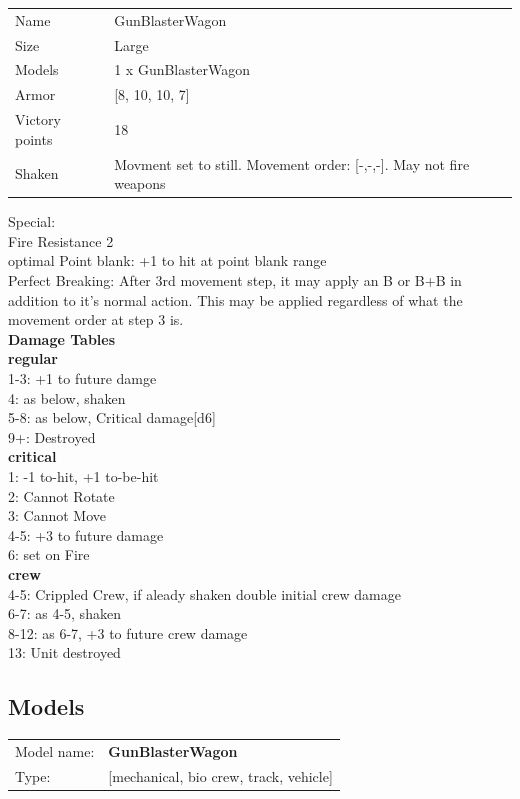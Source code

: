 \begin{tabular}{ll}
  Name & GunBlasterWagon \\
  Size & Large\\
  Models & 1 x GunBlasterWagon\\
  Armor & [8, 10, 10, 7]\\
  Victory points & 18\\
  Shaken & Movment set to still. Movement order: [-,-,-]. May not fire weapons\\
\end{tabular}

Special: \\
Fire Resistance 2\\ 
optimal Point blank: +1 to hit at point blank range\\ 
Perfect Breaking: After 3rd movement step, it may apply an B or B+B in addition to it's normal action. This may be applied regardless of what the movement order at step 3 is.\\ 



{\bf Damage Tables} \\
 {\bf regular } \\
1-3: +1 to future damge \\
4: as below, shaken \\
5-8: as below, Critical damage[d6] \\
9+: Destroyed \\
 {\bf critical } \\
1: -1 to-hit, +1 to-be-hit \\
2: Cannot Rotate \\
3: Cannot Move \\
4-5: +3 to future damage \\
6: set on Fire \\
{\bf crew } \\
4-5: Crippled Crew, if aleady shaken double initial crew damage \\
6-7: as 4-5, shaken \\
8-12: as 6-7, +3 to future crew damage \\
13: Unit destroyed \\


\clearpage

\subsection{ Models }

\begin{tabular}{ll}
Model name: & {\bf GunBlasterWagon } \\
Type: & [mechanical, bio crew, track, vehicle] \\
\end{tabular}


